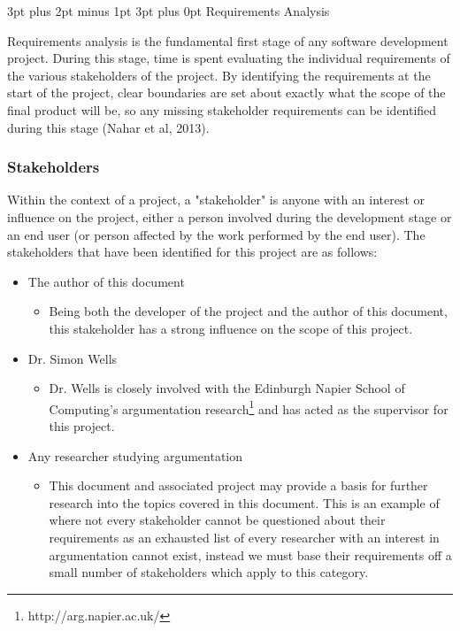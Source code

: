 \documentclass[12pt,a4paper]{article}
\makeatletter
\renewcommand\subsection{\@startsection {subsection}{1}{2mm} %
                               {3pt plus 2pt minus 1pt} %
                               {3pt plus 0pt} %
                               {\normalfont\bfseries}}
\makeatother
\begin{document}
\subsection{Requirements Analysis}

Requirements analysis is the fundamental first stage of any software development project. During this stage, time is spent evaluating the individual requirements of the various stakeholders of the project. By identifying the requirements at the start of the project, clear boundaries are set about exactly what the scope of the final product will be, so any missing stakeholder requirements can be identified during this stage (Nahar et al, 2013).

\subsubsection{Stakeholders}

Within the context of a project, a "stakeholder" is anyone with an interest or influence on the project, either a person involved during the development stage or an end user (or person affected by the work performed by the end user). The stakeholders that have been identified for this project are as follows:
\begin{itemize}
    \item The author of this document
    \begin{itemize}
        \item Being both the developer of the project and the author of this document, this stakeholder has a strong influence on the scope of this project.
    \end{itemize}
    \item Dr. Simon Wells
    \begin{itemize}
        \item Dr. Wells is closely involved with the Edinburgh Napier School of Computing's argumentation research\footnote{http://arg.napier.ac.uk/} and has acted as the supervisor for this project.
    \end{itemize}
    \item Any researcher studying argumentation
    \begin{itemize}
        \item This document and associated project may provide a basis for further research into the topics covered in this document. This is an example of where not every stakeholder cannot be questioned about their requirements as an exhausted list of every researcher with an interest in argumentation cannot exist, instead we must base their requirements off a small number of stakeholders which apply to this category.
    \end{itemize}
\end{itemize}
\end{document}
